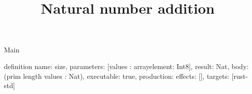 \begin{lexlean}{Main}
\title{Natural number addition}
\begin{semanticmodule}
definition{
  name: size,
  parameters: [values : array{element: Int8}],
  result: Nat,
  body: (prim length values : Nat),
  executable: true,
  production: {effects: [], targets: [rust-std]}
}
\end{semanticmodule}
\end{lexlean}
